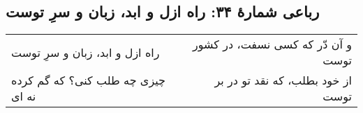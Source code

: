 \begin{center}
\section*{رباعی شمارهٔ ۳۴: راه ازل و ابد، زبان و سرِ توست}
\label{sec:034}
\begin{longtable}{l p{0.5cm} r}
راه ازل و ابد، زبان و سرِ توست
&&
و آن دّر که کسی نسفت، در کشور توست
\\
چیزی چه طلب کنی؟ که گم کرده نه ای
&&
از خود بطلب، که نقد تو در بر توست
\\
\end{longtable}
\end{center}
